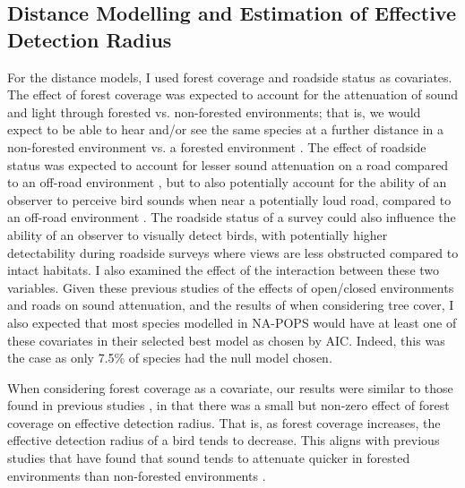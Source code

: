 \subsection{Distance Modelling and Estimation of Effective Detection Radius}

\par For the distance models, I used forest coverage and roadside status as covariates. The effect of forest coverage was expected to account for the attenuation of sound and light through forested vs. non-forested environments; that is, we would expect to be able to hear and/or see the same species at a further distance in a non-forested environment vs. a forested environment \citep{yip_sound_2017}. The effect of roadside status was expected to account for lesser sound attenuation on a road compared to an off-road environment \citep{yip_sound_2017}, but to also potentially account for the ability of an observer to perceive bird sounds when near a potentially loud road, compared to an off-road environment \citep{pacifici_effects_2008, cooke_road_2020}. The roadside status of a survey could also influence the ability of an observer to visually detect birds, with potentially higher detectability during roadside surveys where views are less obstructed compared to intact habitats. I also examined the effect of the interaction between these two variables. Given these previous studies of the effects of open/closed environments and roads on sound attenuation, and the results of \citet{solymos_calibrating_2013} when considering tree cover, I also expected that most species modelled in NA-POPS would have at least one of these covariates in their selected best model as chosen by AIC. Indeed, this was the case as only 7.5\% of species had the null model chosen.

\par When considering forest coverage as a covariate, our results were similar to those found in previous studies \citep{solymos_calibrating_2013, yip_sound_2017}, in that there was a small but non-zero effect of forest coverage on effective detection radius. That is, as forest coverage increases, the effective detection radius of a bird tends to decrease. This aligns with previous studies that have found that sound tends to attenuate quicker in forested environments than non-forested environments \citep{yip_sound_2017}.

